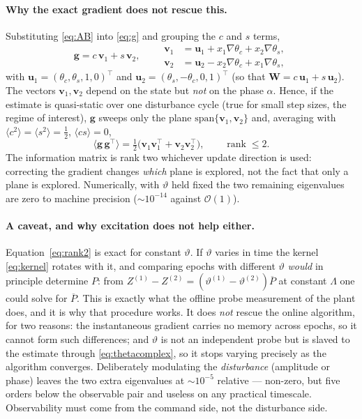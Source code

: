 \documentclass[11pt]{article}
\newcommand{\vW}{\mathbf{W}}
\newcommand{\vg}{\mathbf{g}}
\newcommand{\vv}{\mathbf{v}}
\newcommand{\vu}{\mathbf{u}}
\newcommand{\grad}{\nabla}
\begin{document}
\paragraph{Why the exact gradient does not rescue this.}
Substituting \eqref{eq:AB} into \eqref{eq:g} and grouping the $c$ and $s$
terms,
\begin{equation}
  \vg = c\,\vv_1 + s\,\vv_2,\qquad
  \begin{aligned}
    \vv_1 &= \vu_1 + x_1\grad\theta_c + x_2\grad\theta_s,\\
    \vv_2 &= \vu_2 - x_2\grad\theta_c + x_1\grad\theta_s,
  \end{aligned}
  \label{eq:cvs}
\end{equation}
with $\vu_1=(\theta_c,\theta_s,1,0)^{\!\top}$ and
$\vu_2=(\theta_s,-\theta_c,0,1)^{\!\top}$ (so that
$\vW=c\,\vu_1+s\,\vu_2$). The vectors $\vv_1,\vv_2$ depend on the state but
\emph{not} on the phase $\alpha$. Hence, if the estimate is quasi-static
over one disturbance cycle (true for small step sizes, the regime of
interest), $\vg$ sweeps only the plane
$\mathrm{span}\{\vv_1,\vv_2\}$ and, averaging with
$\langle c^2\rangle=\langle s^2\rangle=\tfrac12$, $\langle cs\rangle=0$,
\begin{equation}
  \langle \vg\,\vg^{\!\top}\rangle
    = \tfrac12\big(\vv_1\vv_1^{\!\top}+\vv_2\vv_2^{\!\top}\big),
  \qquad \operatorname{rank}\le 2 .
  \label{eq:rank2}
\end{equation}
The information matrix is rank two whichever update direction is used:
correcting the gradient changes \emph{which} plane is explored, not the
fact that only a plane is explored. Numerically, with $\vartheta$ held
fixed the two remaining eigenvalues are zero to machine precision
($\sim\!10^{-14}$ against $\mathcal{O}(1)$).

\paragraph{A caveat, and why excitation does not help either.}
Equation~\eqref{eq:rank2} is exact for constant $\vartheta$. If $\vartheta$
varies in time the kernel \eqref{eq:kernel} rotates with it, and comparing
epochs with different $\vartheta$ \emph{would} in principle determine $P$:
from $Z^{(1)}-Z^{(2)}=(\vartheta^{(1)}-\vartheta^{(2)})\overline{P}$ at
constant $\Lambda$ one could solve for $\overline{P}$. This is exactly what
the offline probe measurement of the plant does, and it is why that
procedure works. It does \emph{not} rescue the online algorithm, for two
reasons: the instantaneous gradient carries no memory across epochs, so it
cannot form such differences; and $\vartheta$ is not an independent probe
but is slaved to the estimate through \eqref{eq:thetacomplex}, so it stops
varying precisely as the algorithm converges. Deliberately modulating the
\emph{disturbance} (amplitude or phase) leaves the two extra eigenvalues at
$\sim\!10^{-5}$ relative --- non-zero, but five orders below the observable
pair and useless on any practical timescale. Observability must come from
the command side, not the disturbance side.
\end{document}
